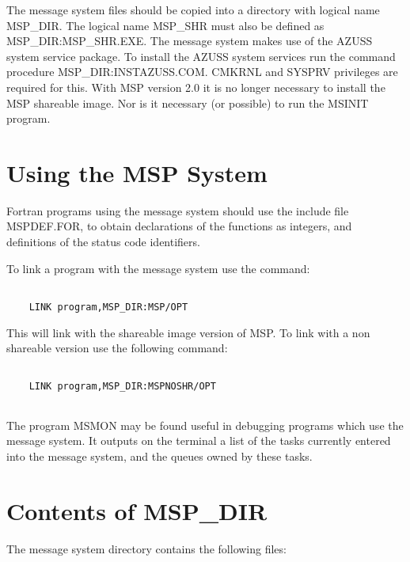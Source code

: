 The message system files should be copied into a directory with logical name
MSP\_DIR. The logical name MSP\_SHR must also be defined as
MSP\_DIR:MSP\_SHR.EXE. The message system makes use of the AZUSS system service
package. To install the AZUSS system services run the command procedure
MSP\_DIR:INSTAZUSS.COM. CMKRNL and SYSPRV privileges are required for this.
With MSP version 2.0 it is no longer necessary to install the MSP shareable
image. Nor is it necessary (or possible) to run the MSINIT program.

\section{Using the MSP System}

Fortran programs using the message system should use the include
file MSPDEF.FOR, to obtain declarations of the functions as integers,
and definitions of the status code identifiers. 

To link a program with the message system use the command:
\begin{verbatim}

    LINK program,MSP_DIR:MSP/OPT

\end{verbatim}
This will link with the shareable image version of MSP. To link with a non
shareable version use the following command:
\begin{verbatim}

    LINK program,MSP_DIR:MSPNOSHR/OPT
                    
\end{verbatim}
The program MSMON may be found useful in debugging programs which
use the message system. It outputs on the terminal a list of the tasks
currently entered into the message system, and the queues owned by
these tasks.

\section{Contents of MSP\_DIR}

The message system directory contains the following files:

